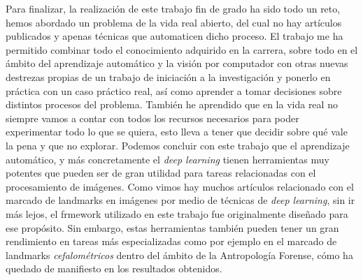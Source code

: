 \medskip

\noindent Para finalizar, la realización de este trabajo fin de grado ha sido todo un reto, hemos abordado un problema de la vida real abierto, del cual no hay artículos publicados y apenas técnicas que automaticen dicho proceso. El trabajo me ha permitido combinar todo el conocimiento adquirido en la carrera, sobre todo en el ámbito del aprendizaje automático y la visión por computador con otras nuevas destrezas propias de un trabajo de iniciación a la investigación y ponerlo en práctica con un caso práctico real, así como aprender a tomar decisiones sobre distintos procesos del problema. También he aprendido que en la vida real no siempre vamos a contar con todos los recursos necesarios para poder experimentar todo lo que se quiera, esto lleva a tener que decidir sobre qué vale la pena y que no explorar. Podemos concluir con este trabajo que el aprendizaje automático, y más concretamente el \textit{deep learning} tienen herramientas muy potentes que pueden ser de gran utilidad para tareas relacionadas con el procesamiento de imágenes. Como vimos hay muchos artículos relacionado con el marcado de landmarks en imágenes por medio de técnicas de \textit{deep learning}, sin ir más lejos, el frmework utilizado en este trabajo fue originalmente diseñado para ese propósito. Sin embargo, estas herramientas también pueden tener un gran rendimiento en tareas más especializadas como por ejemplo en el marcado de landmarks \textit{cefalométricos} dentro del ámbito de la Antropología Forense, cómo ha quedado de manifiesto en los resultados obtenidos.


\endinput

